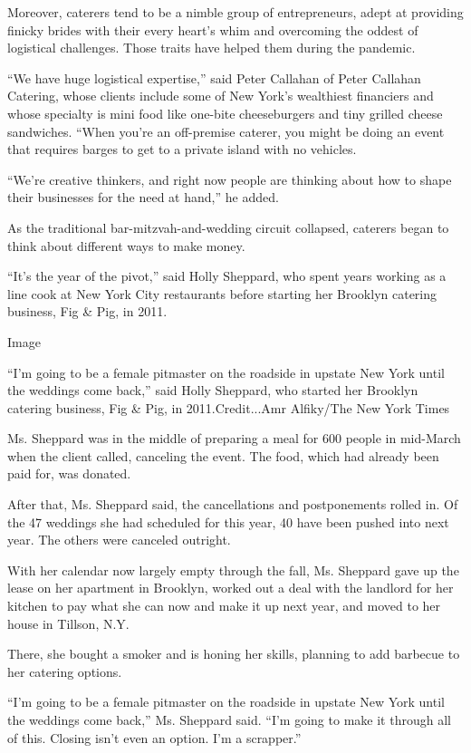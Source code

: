 Moreover, caterers tend to be a nimble group of entrepreneurs, adept at
providing finicky brides with their every heart's whim and overcoming
the oddest of logistical challenges. Those traits have helped them
during the pandemic.

``We have huge logistical expertise,'' said Peter Callahan of Peter
Callahan Catering, whose clients include some of New York's wealthiest
financiers and whose specialty is mini food like one-bite cheeseburgers
and tiny grilled cheese sandwiches. ``When you're an off-premise
caterer, you might be doing an event that requires barges to get to a
private island with no vehicles.

``We're creative thinkers, and right now people are thinking about how
to shape their businesses for the need at hand,'' he added.

As the traditional bar-mitzvah-and-wedding circuit collapsed, caterers
began to think about different ways to make money.

``It's the year of the pivot,'' said Holly Sheppard, who spent years
working as a line cook at New York City restaurants before starting her
Brooklyn catering business, Fig \& Pig, in 2011.

Image

``I'm going to be a female pitmaster on the roadside in upstate New York
until the weddings come back,'' said Holly Sheppard, who started her
Brooklyn catering business, Fig \& Pig, in 2011.Credit...Amr Alfiky/The
New York Times

Ms. Sheppard was in the middle of preparing a meal for 600 people in
mid-March when the client called, canceling the event. The food, which
had already been paid for, was donated.

After that, Ms. Sheppard said, the cancellations and postponements
rolled in. Of the 47 weddings she had scheduled for this year, 40 have
been pushed into next year. The others were canceled outright.

With her calendar now largely empty through the fall, Ms. Sheppard gave
up the lease on her apartment in Brooklyn, worked out a deal with the
landlord for her kitchen to pay what she can now and make it up next
year, and moved to her house in Tillson, N.Y.

There, she bought a smoker and is honing her skills, planning to add
barbecue to her catering options.

``I'm going to be a female pitmaster on the roadside in upstate New York
until the weddings come back,'' Ms. Sheppard said. ``I'm going to make
it through all of this. Closing isn't even an option. I'm a scrapper.''

